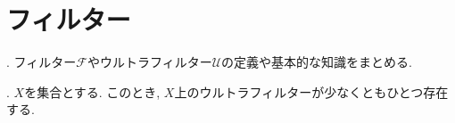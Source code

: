 \documentclass[uplatex, dvipdfmx, a4paper, 12pt, class=jsbook, crop=false]{standalone}
\begin{document}
\section{フィルター}
\label{sec:filters}

\WIP.
フィルター$\mathscr{F}$やウルトラフィルター$\mathscr{U}$の定義や基本的な知識をまとめる.

\begin{theorem}
	\WIP.
	$X$を集合とする.
	このとき, $X$上のウルトラフィルターが少なくともひとつ存在する.
\end{theorem}
\end{document}
